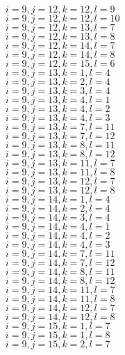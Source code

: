 \documentclass[14pt]{article}
\begin{document}
    $i=9,j=12,k=12,l=9 $ \\ 
    $i=9,j=12,k=12,l=10 $ \\ 
    $i=9,j=12,k=13,l=7 $ \\ 
    $i=9,j=12,k=13,l=8 $ \\ 
    $i=9,j=12,k=14,l=7 $ \\ 
    $i=9,j=12,k=14,l=8 $ \\ 
    $i=9,j=12,k=15,l=6 $ \\ 
    $i=9,j=13,k=1,l=4 $ \\ 
    $i=9,j=13,k=2,l=4 $ \\ 
    $i=9,j=13,k=3,l=4 $ \\ 
    $i=9,j=13,k=4,l=1 $ \\ 
    $i=9,j=13,k=4,l=2 $ \\ 
    $i=9,j=13,k=4,l=3 $ \\ 
    $i=9,j=13,k=7,l=11 $ \\ 
    $i=9,j=13,k=7,l=12 $ \\ 
    $i=9,j=13,k=8,l=11 $ \\ 
    $i=9,j=13,k=8,l=12 $ \\ 
    $i=9,j=13,k=11,l=7 $ \\ 
    $i=9,j=13,k=11,l=8 $ \\ 
    $i=9,j=13,k=12,l=7 $ \\ 
    $i=9,j=13,k=12,l=8 $ \\ 
    $i=9,j=14,k=1,l=4 $ \\ 
    $i=9,j=14,k=2,l=4 $ \\ 
    $i=9,j=14,k=3,l=4 $ \\ 
    $i=9,j=14,k=4,l=1 $ \\ 
    $i=9,j=14,k=4,l=2 $ \\ 
    $i=9,j=14,k=4,l=3 $ \\ 
    $i=9,j=14,k=7,l=11 $ \\ 
    $i=9,j=14,k=7,l=12 $ \\ 
    $i=9,j=14,k=8,l=11 $ \\ 
    $i=9,j=14,k=8,l=12 $ \\ 
    $i=9,j=14,k=11,l=7 $ \\ 
    $i=9,j=14,k=11,l=8 $ \\ 
    $i=9,j=14,k=12,l=7 $ \\ 
    $i=9,j=14,k=12,l=8 $ \\ 
    $i=9,j=15,k=1,l=7 $ \\ 
    $i=9,j=15,k=1,l=8 $ \\ 
    $i=9,j=15,k=2,l=7 $ \\ 
\end{document}
